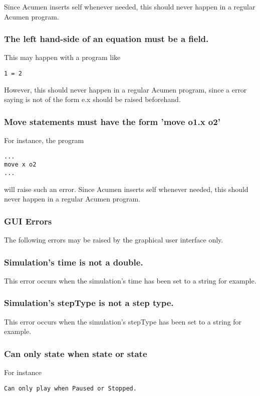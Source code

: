 Since Acumen inserts self whenever needed, this should never happen in a regular Acumen program.
\subsubsection{The left hand-side of an equation must be a field.}

This may happen with a program like
%
\begin{lstlisting}
1 = 2
\end{lstlisting}

However, this should never happen in a regular Acumen program, since a error saying is not of the form e.x should be raised beforehand.
\subsubsection{Move statements must have the form 'move o1.x o2'}

For instance, the program
%
\begin{lstlisting}
...
move x o2 
...
\end{lstlisting}
%
will raise such an error. Since Acumen inserts self whenever needed, this should never happen in a regular Acumen program.
\subsubsection{GUI Errors}

The following errors may be raised by the graphical user interface only.
\subsubsection{Simulation's time is not a double.}

This error occurs when the simulation's time has been set to a string for example.
\subsubsection{Simulation's stepType is not a step type.}

This error occurs when the simulation's stepType has been set to a string for example.
\subsubsection{Can only state when state or state}

For instance

\begin{lstlisting}
Can only play when Paused or Stopped.
\end{lstlisting}

